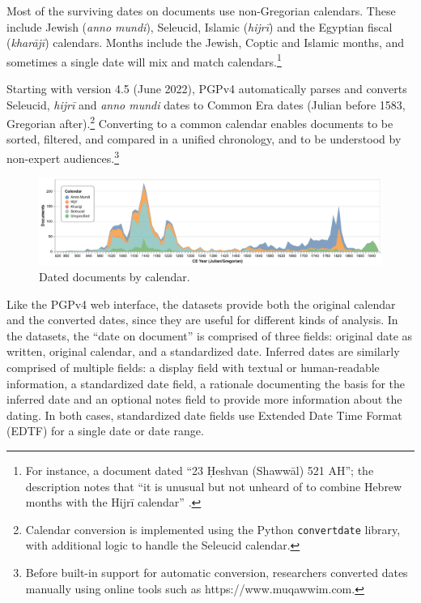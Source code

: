 \documentclass{article}
\begin{document}
Most of the surviving dates on documents use non-Gregorian calendars. These include Jewish (\textit{anno mundi}),  Seleucid, Islamic (\textit{hijrī}) and the Egyptian fiscal (\textit{kharājī}) calendars. Months include the Jewish, Coptic and Islamic months, and sometimes a single date will mix and match calendars.\footnote{For instance, a document dated “23 Ḥeshvan (Shawwāl) 521 AH”;  the description notes that “it is unusual but not unheard of to combine Hebrew months with the Hijrī calendar” \autocite{noauthor_legal_1127} .} 

Starting with version 4.5 (June 2022), PGPv4 automatically parses and converts Seleucid, \textit{hijrī} and \textit{anno mundi} dates to Common Era dates (Julian before 1583, Gregorian after).\footnote{Calendar conversion is implemented using the Python \texttt{convertdate} library, with additional logic to handle the Seleucid calendar.} Converting to a common calendar enables documents to be sorted, filtered, and compared in a unified chronology, and to be understood by non-expert audiences.\footnote{Before built-in support for automatic conversion, researchers converted dates manually using online tools such as https://www.muqawwim.com.} 

\begin{figure}[!hbt]
  \centering
  \includegraphics[width=\textwidth]{charts/dated_docs_by_cal.pdf}
  \caption{Dated documents by calendar.}
  \label{fig:docs_dating_combined}
\end{figure}

Like the PGPv4 web interface, the datasets provide both the original calendar and the converted dates, since they are useful for different kinds of analysis. In the datasets, the “date on document” is comprised of three fields: original date as written, original calendar, and a standardized date. Inferred dates are similarly comprised of multiple fields: a display field with textual or human-readable information, a standardized date field, a rationale documenting the basis for the inferred date and an optional notes field to provide more information about the dating. In both cases, standardized date fields use Extended Date Time Format (EDTF) for a single date or date range.
\end{document}
